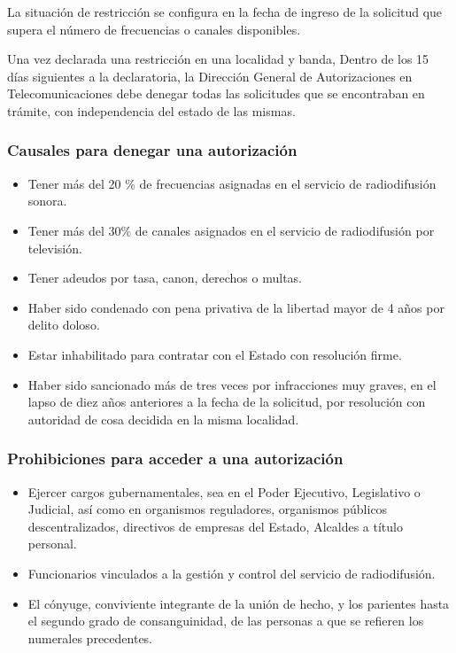 \documentclass[a4paper]{IEEEtran} %
\begin{document}
La  situación  de  restricción  se  configura  en  la 
fecha  de  ingreso  de  la  solicitud  que  supera  el 
número de frecuencias o canales disponibles.  

Una vez declarada una restricción en una localidad y banda, Dentro de los 15 días siguientes a la declaratoria, la Dirección General de 
Autorizaciones en Telecomunicaciones debe 
denegar todas las solicitudes que se encontraban en trámite, con independencia del estado  de las 
mismas.

\subsubsection{Causales para denegar una autorización}

\begin{itemize}
	\item  Tener  más  del  20 \%  de  frecuencias  asignadas 
	en el servicio de radiodifusión sonora. 
	\item Tener más del 30\% de canales asignados en el 
	servicio de radiodifusión por televisión.
	\item Tener  adeudos  por  tasa,  canon,  derechos  o 
	multas. 
	\item Haber sido condenado con pena 
	privativa  de  la  libertad  mayor  de  4  años  por 
	delito  doloso. 
	\item Estar  inhabilitado  para  contratar 
	con el Estado con resolución firme. 
	\item Haber  sido  sancionado  más  de  tres  veces  por 
	infracciones muy graves, en el lapso de diez años 
	anteriores a la fecha de la solicitud, por 
	resolución  con  autoridad  de  cosa  decidida  en  la 
	misma localidad.
\end{itemize}

\subsubsection{Prohibiciones para acceder a una autorización}

\begin{itemize}
	\item Ejercer cargos gubernamentales, sea en el 
	Poder  Ejecutivo,  Legislativo  o  Judicial,  así  como 
	en organismos reguladores, organismos públicos 
	descentralizados, directivos de empresas del 
	Estado, Alcaldes a título personal.
	\item Funcionarios  vinculados  a  la  gestión  y  control 
	del servicio de radiodifusión. 
	\item El cónyuge, conviviente integrante de la unión 
	de hecho, y los parientes hasta el segundo grado de consanguinidad, de las personas a que se 
	refieren los numerales precedentes. 
\end{itemize}
\end{document}
